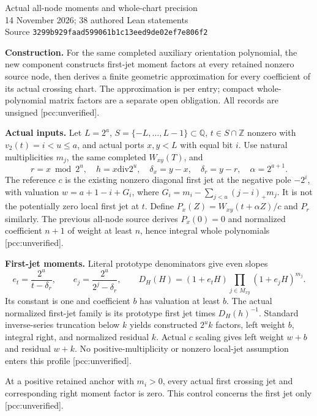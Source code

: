 \documentclass[10pt]{article}
\begin{document}
\begin{center}
{\Large Actual all-node moments and whole-chart precision}\\[4pt]
14 November 2026; 38 authored Lean statements\\
Source \texttt{3299b929faad599061b1c13eed9de02ef7e806f2}
\end{center}
\textbf{Construction.} For the same completed auxiliary orientation polynomial,
the new component constructs first-jet moment factors at every retained
nonzero source node, then derives a finite geometric approximation for every
coefficient of its actual crossing chart. The approximation is per entry;
compact whole-polynomial matrix factors are a separate open obligation.
All records are unsigned [pcc:unverified].

\textbf{Actual inputs.} Let $L=2^a$, $S=\{-L,\ldots,L-1\}\subset\mathbb Q$,
$t\in S\cap\mathbb Z$ nonzero with $v_2(t)=i<u\le a$, and actual ports
$x,y<L$ with equal bit $i$. Use natural multiplicities $m_j$, the same
completed $W_{xy}(T)$, and
\[
 r=x\bmod2^u,\quad h=x\mathbin{\mathrm{div}}2^u,\quad
 \delta_x=y-x,\quad\delta_r=y-r,\quad\alpha=2^{a+1}.
\]
The reference $c$ is the existing nonzero diagonal first jet at the negative
pole $-2^i$, with valuation $w=a+1-i+G_i$, where
$G_i=m_i-\sum_{j<u}(j-i)_+m_j$. It is not the potentially zero local
first jet at $t$. Define $P_x(Z)=W_{xy}(t+\alpha Z)/c$ and $P_r$ similarly.
The previous all-node source derives $P_x(0)=0$ and normalized coefficient
$n+1$ of weight at least $n$, hence integral whole polynomials
[pcc:unverified].

\textbf{First-jet moments.} Literal prototype denominators give even slopes
\[
 e_t=\frac{2^u}{t-\delta_r},\qquad e_j=\frac{2^u}{2^j-\delta_r},\qquad
 D_H(H)=(1+e_tH)\prod_{j\in M_{xy}}(1+e_jH)^{m_j}.
\]
Its constant is one and coefficient $b$ has valuation at least $b$.
The actual normalized first-jet family is its prototype first jet times
$D_H(h)^{-1}$. Standard inverse-series truncation below $k$ yields constructed
$2^u k$ factors, left weight $b$, integral right, and normalized residual
$k$. Actual $c$ scaling gives left weight $w+b$ and residual $w+k$.
No positive-multiplicity or nonzero local-jet assumption enters this profile
[pcc:unverified].

At a positive retained anchor with $m_i>0$, every actual first crossing jet
and corresponding right moment factor is zero. This control concerns the first jet only [pcc:unverified].
\end{document}
